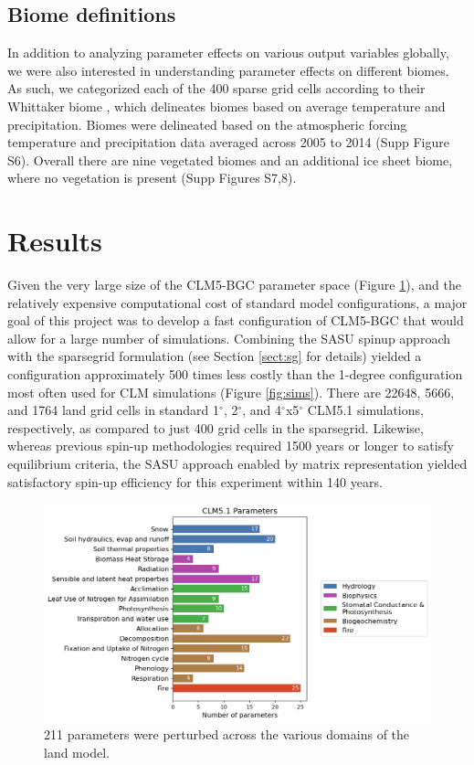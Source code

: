 \documentclass[draft]{agujournal2019}
\begin{document}
\subsection{Biome definitions}
\label{sect:whit}
In addition to analyzing parameter effects on various output variables globally, we were also interested in understanding parameter effects on different biomes. As such, we categorized each of the 400 sparse grid cells according to their Whittaker biome \cite{whittaker1970}, which delineates biomes based on average temperature and precipitation. Biomes were delineated based on the atmospheric forcing temperature and precipitation data averaged across 2005 to 2014 (Supp Figure S6). Overall there are nine vegetated biomes and an additional ice sheet biome, where no vegetation is present (Supp Figures S7,8).

\section{Results}

Given the very large size of the CLM5-BGC parameter space (Figure \ref{fig:params}), and the relatively expensive computational cost of standard model configurations, a major goal of this project was to develop a fast configuration of CLM5-BGC that would allow for a large number of simulations. Combining the SASU spinup approach with the sparsegrid formulation (see Section \ref{sect:sg} for details) yielded a configuration approximately 500 times less costly than the 1-degree configuration most often used for CLM simulations (Figure \ref{fig:sims}). There are 22648, 5666, and 1764 land grid cells in standard 1$^{\circ}$, 2$^{\circ}$, and 4$^{\circ}$x5$^{\circ}$ CLM5.1 simulations, respectively, as compared to just 400 grid cells in the sparsegrid. Likewise, whereas previous spin-up methodologies required 1500 years or longer to satisfy equilibrium criteria, the SASU approach enabled by matrix representation yielded satisfactory spin-up efficiency for this experiment within 140 years.

\begin{figure}[h]
\centering
\includegraphics[width=\textwidth]{../figs/main/bar.png}
\caption{211 parameters were perturbed across the various domains of the land model.}
\label{fig:params}
\end{figure}
\end{document}
